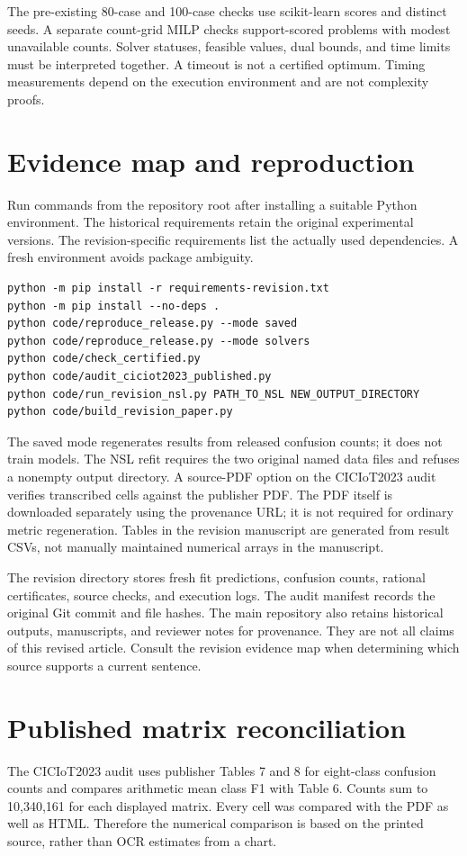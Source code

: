 \documentclass[onecolumn]{svjour3}
\begin{document}
The pre-existing 80-case and 100-case checks use scikit-learn scores and distinct seeds. A separate count-grid MILP checks support-scored problems with modest unavailable counts. Solver statuses, feasible values, dual bounds, and time limits must be interpreted together. A timeout is not a certified optimum. Timing measurements depend on the execution environment and are not complexity proofs.

\section{Evidence map and reproduction}
Run commands from the repository root after installing a suitable Python environment. The historical requirements retain the original experimental versions. The revision-specific requirements list the actually used dependencies. A fresh environment avoids package ambiguity.

\begin{verbatim}
python -m pip install -r requirements-revision.txt
python -m pip install --no-deps .
python code/reproduce_release.py --mode saved
python code/reproduce_release.py --mode solvers
python code/check_certified.py
python code/audit_ciciot2023_published.py
python code/run_revision_nsl.py PATH_TO_NSL NEW_OUTPUT_DIRECTORY
python code/build_revision_paper.py
\end{verbatim}

The saved mode regenerates results from released confusion counts; it does not train models. The NSL refit requires the two original named data files and refuses a nonempty output directory. A source-PDF option on the CICIoT2023 audit verifies transcribed cells against the publisher PDF. The PDF itself is downloaded separately using the provenance URL; it is not required for ordinary metric regeneration. Tables in the revision manuscript are generated from result CSVs, not manually maintained numerical arrays in the manuscript.

The revision directory stores fresh fit predictions, confusion counts, rational certificates, source checks, and execution logs. The audit manifest records the original Git commit and file hashes. The main repository also retains historical outputs, manuscripts, and reviewer notes for provenance. They are not all claims of this revised article. Consult the revision evidence map when determining which source supports a current sentence.

\section{Published matrix reconciliation}
The CICIoT2023 audit uses publisher Tables 7 and 8 for eight-class confusion counts and compares arithmetic mean class F1 with Table 6. Counts sum to 10,340,161 for each displayed matrix. Every cell was compared with the PDF as well as HTML. Therefore the numerical comparison is based on the printed source, rather than OCR estimates from a chart.
\end{document}
